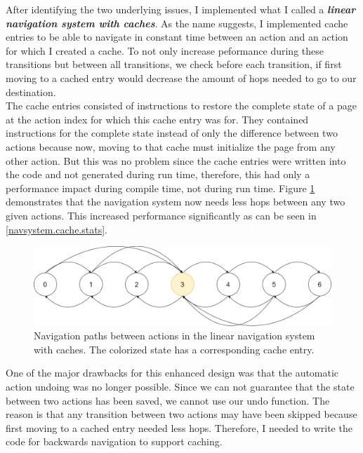 \par

After identifying the two underlying issues, I implemented what I called a \textbf{\textit{linear navigation system with caches}}. As the name suggests, I implemented cache entries to be able to navigate in constant time between an action and an action for which I created a cache. To not only increase peformance during these transitions but between all transitions, we check before each transition, if first moving to a cached entry would decrease the amount of hops needed to go to our destination.\\
The cache entries consisted of instructions to restore the complete state of a page at the action index for which this cache entry was for. They contained instructions for the complete state instead of only the difference between two actions because now, moving to that cache must initialize the page from any other action. But this was no problem since the cache entries were written into the code and not generated during run time, therefore, this had only a performance impact during compile time, not during run time. Figure \ref{navsystem.cache.overview} demonstrates that the navigation system now needs less hops between any two given actions. This increased performance significantly as can be seen in \ref{navsystem.cache.stats}. \par

\begin{figure}
\caption{Navigation paths between actions in the linear navigation system with caches. The colorized state has a corresponding cache entry.}
\label{navsystem.cache.overview}
\includegraphics[width=\textwidth]{figures/navigationsystem-cache-overview-2.png}
\end{figure}

One of the major drawbacks for this enhanced design was that the automatic action undoing was no longer possible. Since we can not guarantee that the state between two actions has been saved, we cannot use our undo function. The reason is that any transition between two actions may have been skipped because first moving to a cached entry needed less hops. Therefore, I needed to write the code for backwards navigation to support caching.

